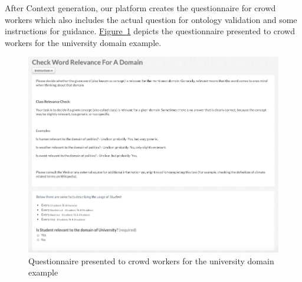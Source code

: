 After Context generation, our platform creates the questionnaire for crowd workers which also includes the actual question for ontology validation and some instructions for guidance. 
\hyperref[fig:university_ontology_questionaire]{Figure~\ref*{fig:university_ontology_questionaire}} depicts the questionnaire presented to crowd workers for the university domain example. 
\begin{figure}
	 \centering
	 \includegraphics[width=\textwidth]{screenshots/questionaire_university_example}
	 \caption{Questionnaire presented to crowd workers for the university domain example}\label{fig:university_ontology_questionaire}
\end{figure}

